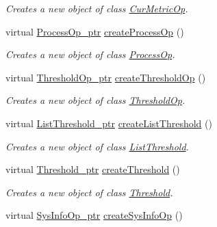 \begin{DoxyCompactItemize}
\begin{DoxyCompactList}\small\item\em Creates a new object of class \hyperlink{classIMS__Data_1_1CurMetricOp}{CurMetricOp}. \item\end{DoxyCompactList}\item 
virtual \hyperlink{classIMS__Data_1_1ProcessOp}{ProcessOp\_\-ptr} \hyperlink{classIMS__Data_1_1IMS__DataFactory_a5237fc16cfdd59ed597f0282d57e903b}{createProcessOp} ()
\begin{DoxyCompactList}\small\item\em Creates a new object of class \hyperlink{classIMS__Data_1_1ProcessOp}{ProcessOp}. \item\end{DoxyCompactList}\item 
virtual \hyperlink{classIMS__Data_1_1ThresholdOp}{ThresholdOp\_\-ptr} \hyperlink{classIMS__Data_1_1IMS__DataFactory_aa89ce32b5823c08d8cfd69b40f59274e}{createThresholdOp} ()
\begin{DoxyCompactList}\small\item\em Creates a new object of class \hyperlink{classIMS__Data_1_1ThresholdOp}{ThresholdOp}. \item\end{DoxyCompactList}\item 
virtual \hyperlink{classIMS__Data_1_1ListThreshold}{ListThreshold\_\-ptr} \hyperlink{classIMS__Data_1_1IMS__DataFactory_a366099c07f9b4462a25f7c6e2cb0bb7b}{createListThreshold} ()
\begin{DoxyCompactList}\small\item\em Creates a new object of class \hyperlink{classIMS__Data_1_1ListThreshold}{ListThreshold}. \item\end{DoxyCompactList}\item 
virtual \hyperlink{classIMS__Data_1_1Threshold}{Threshold\_\-ptr} \hyperlink{classIMS__Data_1_1IMS__DataFactory_aed5883cdc75a112ab3a964b73dd93612}{createThreshold} ()
\begin{DoxyCompactList}\small\item\em Creates a new object of class \hyperlink{classIMS__Data_1_1Threshold}{Threshold}. \item\end{DoxyCompactList}\item 
virtual \hyperlink{classIMS__Data_1_1SysInfoOp}{SysInfoOp\_\-ptr} \hyperlink{classIMS__Data_1_1IMS__DataFactory_aabc8344696aaadbeefa4e02219f44ff9}{createSysInfoOp} ()

\end{DoxyCompactItemize}
